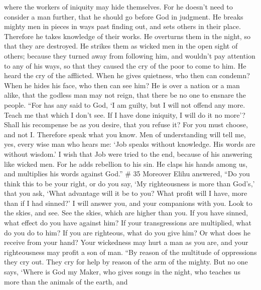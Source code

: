 where the workers of iniquity may hide themselves.  For
he doesn't need to consider a man further, that he should go before God
in judgment.  He breaks mighty men in pieces in ways past
finding out, and sets others in their place.  Therefore
he takes knowledge of their works. He overturns them in the night, so
that they are destroyed.  He strikes them as wicked men
in the open sight of others;  because they turned away
from following him, and wouldn't pay attention to any of his ways,
 so that they caused the cry of the poor to come to him.
He heard the cry of the afflicted.  When he gives
quietness, who then can condemn? When he hides his face, who then can
see him? He is over a nation or a man alike,  that the
godless man may not reign, that there be no one to ensnare the people.
 ``For has any said to God, `I am guilty, but I will not
offend any more.  Teach me that which I don't see. If I
have done iniquity, I will do it no more'?  Shall his
recompense be as you desire, that you refuse it? For you must choose,
and not I. Therefore speak what you know.  Men of
understanding will tell me, yes, every wise man who hears me:
 `Job speaks without knowledge. His words are without
wisdom.'  I wish that Job were tried to the end, because
of his answering like wicked men.  For he adds rebellion
to his sin. He claps his hands among us, and multiplies his words
against God.'' \# 35  Moreover Elihu answered,
 ``Do you think this to be your right, or do you say, `My
righteousness is more than God's,'  that you ask, `What
advantage will it be to you? What profit will I have, more than if I had
sinned?'  I will answer you, and your companions with you.
 Look to the skies, and see. See the skies, which are
higher than you.  If you have sinned, what effect do you
have against him? If your transgressions are multiplied, what do you do
to him?  If you are righteous, what do you give him? Or
what does he receive from your hand?  Your wickedness may
hurt a man as you are, and your righteousness may profit a son of man.
 ``By reason of the multitude of oppressions they cry out.
They cry for help by reason of the arm of the mighty. 
But no one says, `Where is God my Maker, who gives songs in the night,
 who teaches us more than the animals of the earth, and
